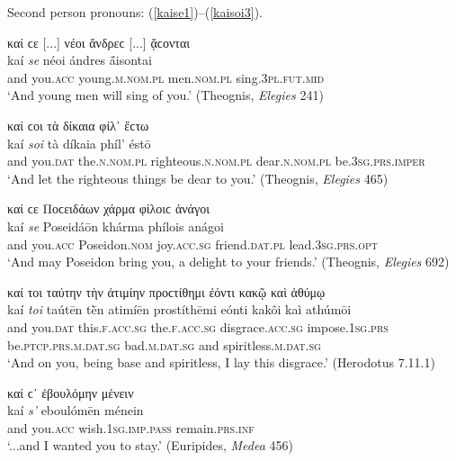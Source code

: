 Second person pronouns: (\ref{kaise1})--(\ref{kaisoi3}).

\begin{exe}
\ex καί ϲε {[}...{]} νέοι ἄνδρεϲ {[}...{]} ᾄϲονται\\
\gll kaí \emph{se} néoi ándres ā́isontai\\
and you.\textsc{acc} young.\textsc{m.nom.pl} men.\textsc{nom.pl} sing.\textsc{3pl.fut.mid}\\
\trans `And young men will sing of you.' (Theognis, \textit{Elegies} 241)
\label{kaise1}
\end{exe}

\begin{exe}
\ex καί ϲοι τὰ δίκαια φίλ᾽ ἔϲτω\\
\gll kaí \emph{soi} tà díkaia phíl' éstō\\
and you.\textsc{dat} the.\textsc{n.nom.pl} righteous.\textsc{n.nom.pl}
dear.\textsc{n.nom.pl} be.\textsc{3sg.prs.imper}\\
\trans `And let the righteous things be dear to you.' (Theognis, \textit{Elegies} 465)
\label{kaisoi1}
\end{exe}

\begin{exe}
\ex καί ϲε Ποϲειδάων χάρμα φίλοιϲ ἀνάγοι\\
\gll kaí \emph{se} Poseidáōn khárma phílois anágoi\\
and you.\textsc{acc} Poseidon.\textsc{nom} joy.\textsc{acc.sg}
friend.\textsc{dat.pl} lead.\textsc{3sg.prs.opt}\\
\trans `And may Poseidon bring you, a delight to your friends.' (Theognis, \textit{Elegies} 692)
\label{kaise2}
\end{exe}

\begin{exe}
\ex καί τοι ταύτην τὴν ἀτιμίην προϲτίθημι ἐόντι κακῷ καὶ ἀθύμῳ\\
\gll kaí \emph{toi} taútēn tḕn atimíēn prostíthēmi eónti kakôi kaì athúmōi\\
and you.\textsc{dat} this.\textsc{f.acc.sg} the.\textsc{f.acc.sg}
disgrace.\textsc{acc.sg} impose.\textsc{1sg.prs} be.\textsc{ptcp.prs.m.dat.sg} bad.\textsc{m.dat.sg} and spiritless.\textsc{m.dat.sg}\\
\trans `And on you, being base and spiritless, I lay this disgrace.' (Herodotus 7.11.1)
\label{kaitoi1}
\end{exe}

\begin{exe}
\ex καί ϲ᾽ ἐβουλόμην μένειν\\
\gll kaí \emph{s'} eboulómēn ménein\\
and you.\textsc{acc} wish.\textsc{1sg.imp.pass} remain.\textsc{prs.inf}\\
\trans `...and I wanted you to stay.' (Euripides, \textit{Medea} 456)
\label{kaise3}
\end{exe}

